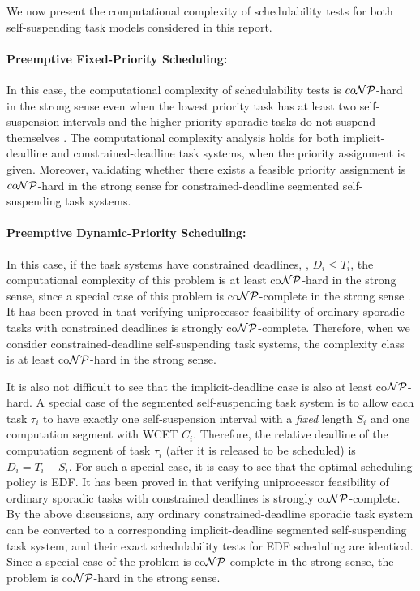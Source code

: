 
We now present the computational complexity of schedulability tests for both self-suspending task models considered in this report.


\paragraph{Preemptive Fixed-Priority Scheduling:}   
In this case, the computational complexity of schedulability tests is $co{\cal NP}$-hard in the strong sense even when the lowest priority task has at least two self-suspension intervals and the higher-priority sporadic tasks do not suspend themselves \cite{RTSS2016-suspension,DBLP:conf/rtns/MohaqeqiE016}. The computational complexity analysis holds for both implicit-deadline and constrained-deadline task systems, when the priority assignment is given.  Moreover, validating whether there exists a feasible priority assignment is $co{\cal NP}$-hard in the strong sense for constrained-deadline segmented self-suspending task systems.

\paragraph{Preemptive Dynamic-Priority Scheduling:} 
In this case, if the task systems have constrained deadlines, \ie, $D_i \leq T_i$, the computational complexity of this problem is at least co${\cal NP}$-hard in the strong sense, since a special case of this problem is co${\cal NP}$-complete in the strong sense \cite{DBLP:conf/ecrts/Ekberg015}. It has been proved in \cite{DBLP:conf/ecrts/Ekberg015} that verifying uniprocessor feasibility of ordinary sporadic tasks with constrained deadlines is strongly co${\cal NP}$-complete.  Therefore, when we consider constrained-deadline self-suspending task systems, the complexity class is at least co${\cal NP}$-hard in the strong sense.

It is also not difficult to see that the implicit-deadline case is also at least co${\cal NP}$-hard.  A special case of the segmented self-suspending task system is to allow each task $\tau_i$ to have exactly one self-suspension interval with a \emph{fixed} length $S_i$ and one computation segment with WCET $C_i$.  Therefore, the relative deadline of the computation segment of task $\tau_i$ (after it is released to be scheduled) is $D_i = T_i-S_i$. For such a special case, it is easy to see that the optimal scheduling policy is EDF. 
It has been proved in \cite{DBLP:conf/ecrts/Ekberg015} that verifying uniprocessor feasibility of ordinary sporadic tasks with constrained deadlines is strongly co${\cal NP}$-complete.
By the above discussions, any ordinary constrained-deadline sporadic task system can be converted to a corresponding implicit-deadline segmented self-suspending task system, and their exact schedulability tests for EDF scheduling are identical. Since a special case of the problem is co${\cal NP}$-complete in the strong sense, the problem is co${\cal NP}$-hard in the strong sense.


